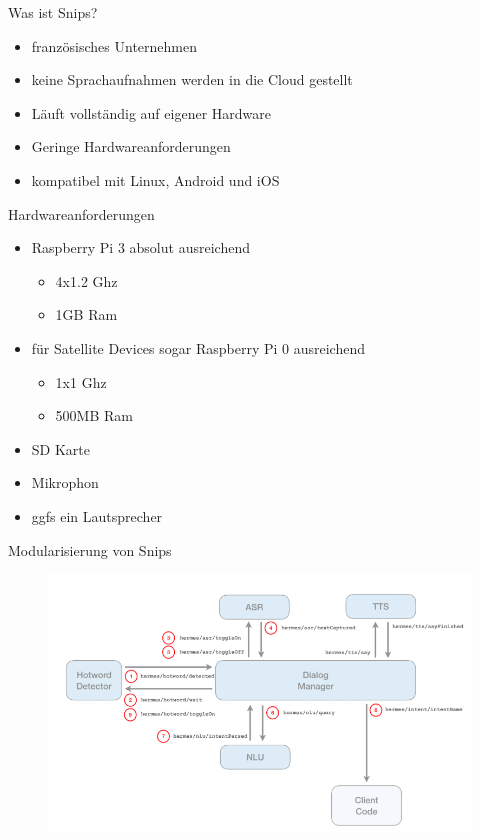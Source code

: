 \documentclass[aspectratio=169]{beamer}
\begin{document}
\begin{frame}{Was ist Snips?}
	\begin{itemize}
		\item französisches Unternehmen
		\item keine Sprachaufnahmen werden in die Cloud gestellt
		\item Läuft vollständig auf eigener Hardware
		\item Geringe Hardwareanforderungen
		\item kompatibel mit Linux, Android und iOS
	\end{itemize}
\end{frame}

\begin{frame}{Hardwareanforderungen}
	\begin{itemize}
		\item Raspberry Pi 3 absolut ausreichend
		\begin{itemize}
			\item 4x1.2 Ghz
			\item 1GB Ram
		\end{itemize}
	    \item für Satellite Devices sogar Raspberry Pi 0 ausreichend
	    \begin{itemize}
	    	\item 1x1 Ghz
	    	\item 500MB Ram
	    \end{itemize}
        \item SD Karte
        \item Mikrophon
        \item ggfs ein Lautsprecher
	\end{itemize}
\end{frame}

\begin{frame}{Modularisierung von Snips}
	\begin{figure}
		\includegraphics[scale=0.4]{images/mqtt-snips}
	\end{figure}
\end{frame}
\end{document}

